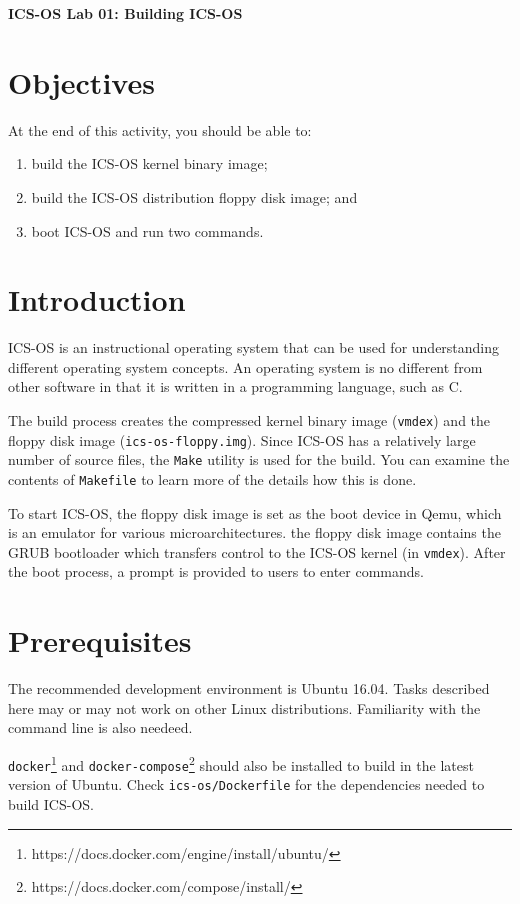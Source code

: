 \documentclass[a4paper, 11pt,oneside]{article}
\begin{document}
\begin{center}
	{\LARGE \textbf{ICS-OS Lab 01: Building ICS-OS}}
\end{center}

\section*{Objectives}
   At the end of this activity, you should be able to:
   \begin{enumerate}[itemsep=0pt,parsep=0pt]
       \item build the ICS-OS kernel binary image;
       \item build the ICS-OS distribution floppy disk image; and
       \item boot ICS-OS and run two commands.
   \end{enumerate}   

\section{Introduction}
ICS-OS is an instructional operating system that can be used for understanding different operating system concepts.  An operating system is no different from other software in that it is written in a programming language, such as C. 

The build process creates the compressed kernel binary image (\texttt{vmdex}) and the floppy disk image (\texttt{ics-os-floppy.img}). Since ICS-OS has a relatively large number of source files, 
the \texttt{Make} utility is used for the build. You can examine the contents of \texttt{Makefile} 
to learn more of the details how this is done.

To start ICS-OS, the floppy disk image is set as the boot device in Qemu, which 
is an emulator for various microarchitectures. the floppy disk image contains 
the GRUB bootloader which transfers control to the ICS-OS kernel (in 
\texttt{vmdex}). After the boot process, a prompt is provided to users to enter 
commands. 

\section{Prerequisites}
The recommended development environment is Ubuntu 16.04. Tasks described here 
may or may not work on other Linux distributions. Familiarity with the command 
line is also needeed. 

\texttt{docker}\footnote{https://docs.docker.com/engine/install/ubuntu/} and 
\texttt{docker-compose}\footnote{https://docs.docker.com/compose/install/} 
should also be installed to build in the latest version of Ubuntu. Check   
\texttt{ics-os/Dockerfile} for the dependencies needed to build ICS-OS.
\end{document}
